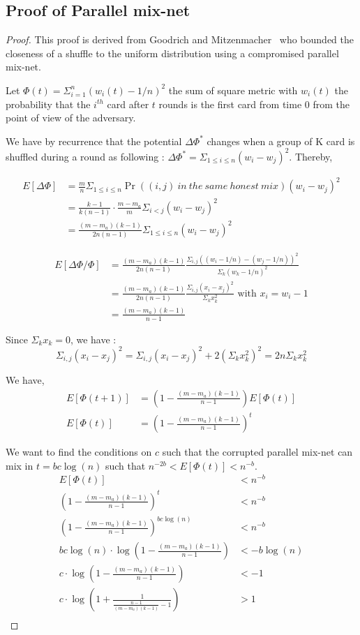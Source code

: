 \documentclass[USenglish,oneside,twocolumn]{article}
\begin{document}
\subsection{Proof of Parallel mix-net}\label{proof:pmn}
\begin{proof}
This proof is derived from Goodrich and Mitzenmacher~\cite{goodrich2012privacy} who bounded the closeness of a shuffle to the uniform distribution using a compromised parallel mix-net. 

Let $\Phi(t)=\Sigma_{i=1}^n (w_i(t)-1/n)^2$ the sum of square metric with $w_i(t)$ the probability that the $i^{th}$ card after $t$ rounds is the first card from time 0 from the point of view of the adversary.

We have by recurrence that the potential $\Delta\Phi^*$ changes when a group of K card is shuffled during a round as following : $\Delta\Phi^*=\Sigma_{1\leq i\leq n}(w_i-w_j)^2$.
Thereby,

\begin{align*}
E[\Delta\Phi] & = \frac{m}{n} \Sigma_{1\leq i\leq n} \Pr((i,j)\ in\ the\ same\ honest\ mix) (w_i-w_j)^2\\
&=\frac{k-1}{k(n-1)}\cdot \frac{m-m_a}{m} \Sigma_{i<j}(w_i-w_j)^2\\
&=\frac{(m-m_a)(k-1)}{2n(n-1)}\Sigma_{1\leq i\leq n}(w_i-w_j)^2
\end{align*}

\begin{align*}
E[\Delta\Phi/\Phi]&=\frac{(m-m_a)(k-1)}{2n(n-1)}\frac{\Sigma_{i,j}((w_i-1/n)-(w_j-1/n))^2}{\Sigma_k (w_k-1/n)^2}\\
&=\frac{(m-m_a)(k-1)}{2n(n-1)}\frac{\Sigma_{i,j}(x_i-x_j)^2}{\Sigma_k x_k^2} \text{ with $x_i=w_i-1$}\\
&=\frac{(m-m_a)(k-1)}{n-1} 
\end{align*}

Since $\Sigma_k x_k=0$, we have :$$\Sigma_{i,j}(x_i-x_j)^2 = \Sigma_{i,j}(x_i-x_j)^2 + 2\left(\Sigma_k x_k^2 \right)^2  = 2n\Sigma_k x_k^2$$

We have,
\begin{align*}
E[\Phi(t+1)] &= (1-\frac{(m-m_a)(k-1)}{n-1}) E[\Phi(t)]\\
E[\Phi(t)]&= (1-\frac{(m-m_a)(k-1)}{n-1})^t
\end{align*} 

We want to find the conditions on $c$ such that the corrupted parallel mix-net can mix in $t=bc\log(n)$  such that  $n^{-2b} < E[\Phi(t)]< n^{-b}$.
\begin{align*}
E[\Phi(t)]&< n^{-b}\\
(1-\frac{(m-m_a)(k-1)}{n-1})^t&< n^{-b}\\
(1-\frac{(m-m_a)(k-1)}{n-1})^{bc\log(n)}&< n^{-b}\\
bc\log(n) \cdot \log(1-\frac{(m-m_a)(k-1)}{n-1}) &< -b \log(n)\\
c\cdot \log(1-\frac{(m-m_a)(k-1)}{n-1}) &< -1\\
c \cdot\log(1+ \frac{1}{\frac{n-1}{(m-m_a)(k-1)}- 1}) &> 1\\
\end{align*}


\end{proof}
\end{document}
